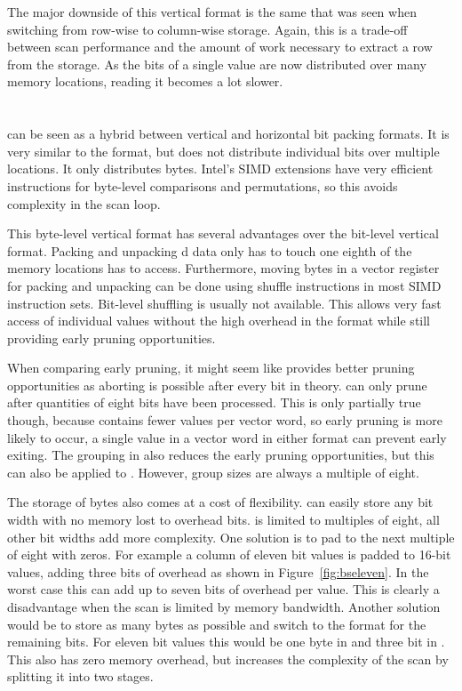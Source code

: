 The major downside of this vertical format is the same that was seen when
switching from row-wise to column-wise storage. Again, this is a trade-off
between scan performance and the amount of work necessary to extract a row from
the storage. As the bits of a single value are now distributed over many memory
locations, reading it becomes a lot slower.
\newpage
\section{\bs{}}

\bs{} \cite{ByteSlice} can be seen as a hybrid between vertical and horizontal
bit packing formats. It is very similar to the \bwv{} format, but does not
distribute individual bits over multiple locations. It only distributes bytes.
Intel's SIMD extensions have very efficient instructions for byte-level
comparisons and permutations, so this avoids complexity in the scan loop.

This byte-level vertical format has several advantages over the bit-level
vertical format. Packing and unpacking \bs{}d data only has to touch one eighth
of the memory locations \bwv{} has to access. Furthermore, moving bytes in a
vector register for packing and unpacking can be done using shuffle instructions
in most SIMD instruction sets. Bit-level shuffling is usually not available.
This allows very fast access of individual values without the high overhead in
the \bwv{} format while still providing early pruning opportunities.

When comparing early pruning, it might seem like \bwv{} provides better pruning
opportunities as aborting is possible after every bit in theory. \bs{} can only
prune after quantities of eight bits have been processed. This is only partially
true though, because \bs{} contains fewer values per vector word, so early pruning
is more likely to occur, a single value in a vector word in either format can
prevent early exiting. The grouping in \bwv{} also reduces the early pruning
opportunities, but this can also be applied to \bs{}. However, \bs{} group sizes
are always a multiple of eight.

The storage of bytes also comes at a cost of flexibility. \bwv{} can easily
store any bit width with no memory lost to overhead bits. \bs{} is limited to
multiples of eight, all other bit widths add more complexity. One solution is to
pad to the next multiple of eight with zeros. For example a column of eleven bit
values is padded to 16-bit values, adding three bits of overhead as shown in
Figure~\ref{fig:bseleven}. In the worst case this can add up to seven bits of
overhead per value. This is clearly a disadvantage when the scan is limited by
memory bandwidth. Another solution would be to store as many bytes as possible
and switch to the \bwv{} format for the remaining bits. For eleven bit values
this would be one byte in \bs{} and three bit in \bwv{}. This also has zero
memory overhead, but increases the complexity of the scan by splitting it into
two stages.

